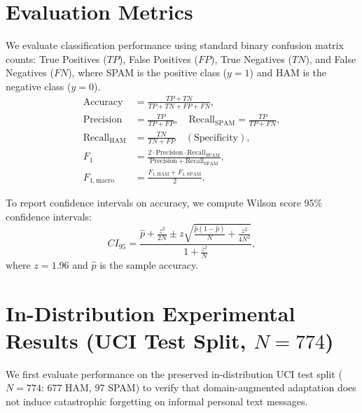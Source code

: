 \documentclass[conference]{IEEEtran}
\begin{document}
\section{Evaluation Metrics}
\label{sec:metrics}

We evaluate classification performance using standard binary confusion matrix counts: True Positives ($TP$), False Positives ($FP$), True Negatives ($TN$), and False Negatives ($FN$), where SPAM is the positive class ($y=1$) and HAM is the negative class ($y=0$).
\begin{align}
    \text{Accuracy} &= \frac{TP + TN}{TP + TN + FP + FN}, \label{eq:acc} \\
    \text{Precision} &= \frac{TP}{TP + FP}, \quad \text{Recall}_{\text{SPAM}} = \frac{TP}{TP + FN}, \label{eq:prec_rec} \\
    \text{Recall}_{\text{HAM}} &= \frac{TN}{TN + FP} \quad (\text{Specificity}), \label{eq:specificity} \\
    F_1 &= \frac{2 \cdot \text{Precision} \cdot \text{Recall}_{\text{SPAM}}}{\text{Precision} + \text{Recall}_{\text{SPAM}}}, \label{eq:f1} \\
    F_{1,\text{macro}} &= \frac{F_{1,\text{HAM}} + F_{1,\text{SPAM}}}{2}. \label{eq:macro_f1}
\end{align}

To report confidence intervals on accuracy, we compute Wilson score 95\% confidence intervals:
\begin{equation}
    CI_{95} = \frac{\hat{p} + \frac{z^2}{2N} \pm z \sqrt{\frac{\hat{p}(1-\hat{p})}{N} + \frac{z^2}{4N^2}}}{1 + \frac{z^2}{N}},
    \label{eq:wilson}
\end{equation}
where $z = 1.96$ and $\hat{p}$ is the sample accuracy.

\section{In-Distribution Experimental Results (UCI Test Split, $N=774$)}
\label{sec:in_distribution_results}

We first evaluate performance on the preserved in-distribution UCI test split ($N=774$: 677 HAM, 97 SPAM) to verify that domain-augmented adaptation does not induce catastrophic forgetting on informal personal text messages.
\end{document}
